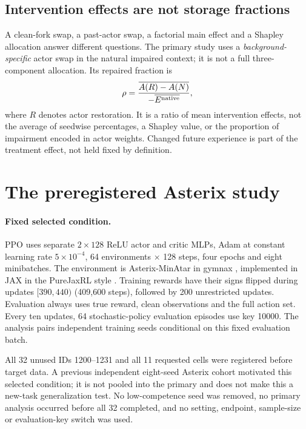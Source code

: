 \documentclass[10pt]{article}
\begin{document}
\subsection{Intervention effects are not storage fractions}
A clean-fork swap, a past-actor swap, a factorial main effect and a Shapley allocation answer different questions. The primary study uses a \emph{background-specific} actor swap in the natural impaired context; it is not a full three-component allocation. Its repaired fraction is
\begin{equation}
\rho=\frac{\overline{A(R)-A(N)}}{-\overline{E^{\rm native}}},
\end{equation}
where $R$ denotes actor restoration. It is a ratio of mean intervention effects, not the average of seedwise percentages, a Shapley value, or the proportion of impairment encoded in actor weights. Changed future experience is part of the treatment effect, not held fixed by definition.

\section{The preregistered Asterix study}\label{m:design}
\paragraph{Fixed selected condition.}
PPO \citep{schulman2017ppo} uses separate $2\times128$ ReLU actor and critic MLPs, Adam at constant learning rate $5\times10^{-4}$, 64 environments $\times$ 128 steps, four epochs and eight minibatches. The environment is Asterix-MinAtar in gymnax \citep{young2019minatar,lange2022gymnax}, implemented in JAX in the PureJaxRL style \citep{lu2022discovered}. Training rewards have their signs flipped during updates $[390,440)$ (409{,}600 steps), followed by 200 unrestricted updates. Evaluation always uses true reward, clean observations and the full action set. Every ten updates, 64 stochastic-policy evaluation episodes use key 10000. The analysis pairs independent training seeds conditional on this fixed evaluation batch.

All 32 unused IDs 1200--1231 and all 11 requested cells were registered before target data. A previous independent eight-seed Asterix cohort motivated this selected condition; it is not pooled into the primary and does not make this a new-task generalization test. No low-competence seed was removed, no primary analysis occurred before all 32 completed, and no setting, endpoint, sample-size or evaluation-key switch was used.
\end{document}
